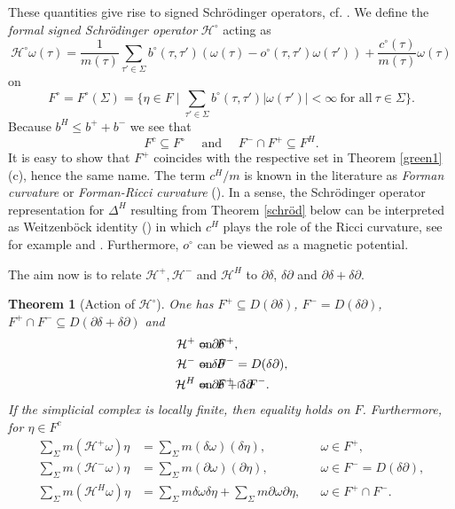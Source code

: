 \documentclass[10pt]{amsart}
\newtheorem{theorem}{Theorem}[section]
\theoremstyle{definition}
\newcommand{\F}{{F}}
\renewcommand{\bullet}{{\circ}}
\begin{document}
These quantities give rise to signed Schrödinger operators, cf. \cite{GKS}. We define the \emph{formal signed Schrödinger operator} $\mathcal{H}^\bullet$ 	acting as
$$\mathcal{H}^\bullet\omega(\tau) = \frac{1}{m(\tau)}\sum_{\tau' \in \Sigma}b^\bullet(\tau,\tau')(\omega(\tau)-o^\bullet(\tau,\tau')\omega(\tau'))+\frac{c^\bullet(\tau)}{m(\tau)}\omega(\tau)$$
on  $$\F^\bullet = \F^\bullet(\Sigma) =\lbrace \eta\in F\mid\sum_{\tau'\in \Sigma}b^\bullet(\tau,\tau')\vert\omega(\tau')\vert<\infty~\text{for all}~\tau\in\Sigma\rbrace.$$
Because $b^{H}\leq b^{+}+b^{-}$ we see that $$F^{c}\subseteq F^{\bullet}\quad\mbox{ and }\quad F^{-}\cap F^{+}\subseteq F^{H}.$$ 
It is easy to show that $F^+$ coincides with the respective set in Theorem \ref{green1} (c), hence the same name.
The term $c^H\slash m$ is known in the literature as \textit{Forman curvature} or \textit{Forman-Ricci curvature} (\cite{F,JM}). In a sense, the Schrödinger operator representation for $\Delta^H$ resulting from Theorem \ref{schröd} below can be interpreted as Weitzenböck identity (\cite[Proposition A3.]{Chavel}) in which $c^H$ plays the role of the Ricci curvature, see for example \cite{F} and \cite{JM}. Furthermore, $o^{\circ}$ can be viewed as a magnetic potential.

The aim now is to relate $\mathcal{H}^{+},\mathcal{H}^{-}$ and $\mathcal{H}^{H}$ to $ \partial\delta$, $\delta\partial$ and $ \partial\delta+\delta\partial$.


\begin{theorem}[Action of $\mathcal{H}^{\circ}$]\label{schröd2}
	One has $F^{+}\subseteq  D(\partial\delta)$,  $F^{-} = D(\delta\partial)$, $\F^{+}\cap F^{-}\subseteq  D(\partial\delta+\delta\partial)$ and
	\begin{align*}
		\mathcal{H}^{+} &=\partial\delta&&\hspace{-2cm}\mbox{ on }\F^{+},\\
		\mathcal{H}^{-}&=\delta\partial&&\hspace{-2cm} \mbox{ on }F^{-}= D(\delta\partial),\\
		\mathcal{H}^{H}&= \partial\delta+\delta\partial&&\hspace{-2cm} \mbox{ on }\F^{+}\cap \F^{-}.
	\end{align*}
	If the simplicial complex is locally finite, then equality holds on $\F$. Furthermore, for $\eta\in \F^{c}$
	\begin{align*}
		\sum_{\Sigma}m (\mathcal{H}^{+}\omega)\eta &=	\sum_{\Sigma}m(\delta\omega)(\delta\eta),&&\omega\in \F^{+},\\
		\sum_{\Sigma}m(\mathcal{H}^{-}\omega)\eta&=	\sum_{\Sigma}m(\partial\omega)(\partial\eta),&& \omega\in F^{-}= D(\delta\partial),\\
		\sum_{\Sigma}m	(\mathcal{H}^{H}\omega)\eta&= 	\sum_{\Sigma}m\delta\omega\delta\eta+\sum_\Sigma m\partial\omega\partial\eta,&& \omega\in \F^{+}\cap \F^{-}.
	\end{align*}
\end{theorem}
\end{document}
